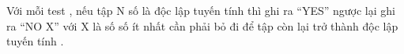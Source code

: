 Với mỗi test , nếu tập N số là độc lập tuyến tính thì ghi ra “YES” ngược lại ghi ra “NO X” với X là số số ít nhất cần phải bỏ đi để tập còn lại trở thành độc lập tuyến tính .